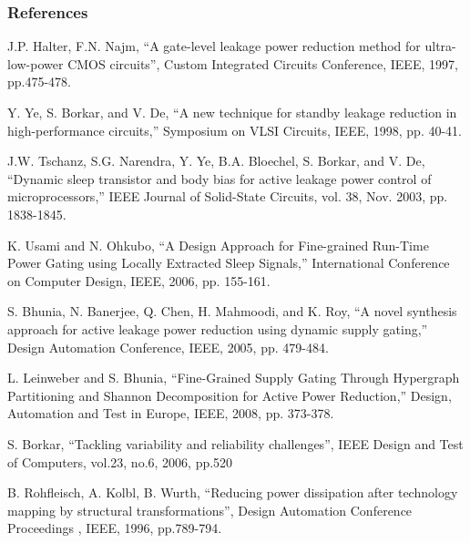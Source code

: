 \begin{frame}[allowframebreaks]
\frametitle<presentation>{References}

\begin{thebibliography}{1}

J.P. Halter, F.N. Najm, ``A gate-level leakage power reduction method for ultra-low-power CMOS circuits'',  Custom Integrated Circuits Conference, IEEE, 1997, pp.475-478.

Y. Ye, S. Borkar, and V. De, ``A new technique for standby leakage reduction in high-performance circuits,'' Symposium on VLSI Circuits, IEEE, 1998, pp. 40-41.

J.W. Tschanz, S.G. Narendra, Y. Ye, B.A. Bloechel, S. Borkar, and V. De, ``Dynamic sleep transistor and body bias for active leakage power control of microprocessors,'' IEEE Journal of Solid-State Circuits, vol. 38, Nov. 2003, pp. 1838-1845.

K. Usami and N. Ohkubo, ``A Design Approach for Fine-grained Run-Time Power Gating using Locally Extracted Sleep Signals,'' International Conference on Computer Design, IEEE, 2006, pp. 155-161.

S. Bhunia, N. Banerjee, Q. Chen, H. Mahmoodi, and K. Roy, ``A novel synthesis approach for active leakage power reduction using dynamic supply gating,'' Design Automation Conference, IEEE, 2005, pp. 479-484.

L. Leinweber and S. Bhunia, ``Fine-Grained Supply Gating Through Hypergraph Partitioning and Shannon Decomposition for Active Power Reduction,'' Design, Automation and Test in Europe, IEEE, 2008, pp. 373-378.

S. Borkar, ``Tackling variability and reliability challenges'', IEEE Design and Test of Computers, vol.23, no.6, 2006, pp.520

B. Rohfleisch, A. Kolbl, B. Wurth, ``Reducing power dissipation after technology mapping by structural transformations'', Design Automation Conference Proceedings , IEEE, 1996, pp.789-794.

\end{thebibliography}
\end{frame}

